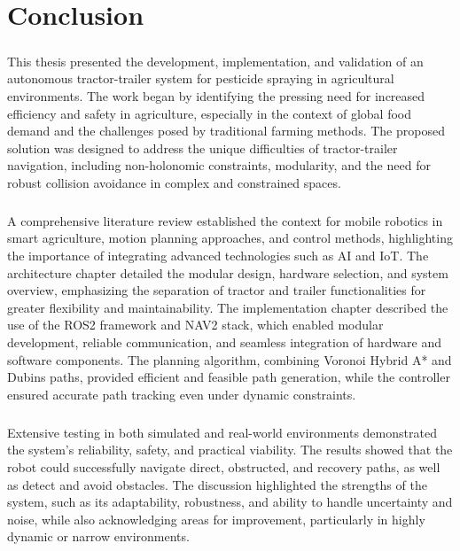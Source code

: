 
\chapter{Conclusion}
\label{cha:conclusion}


\paragraph{}This thesis presented the development, implementation, and validation of an autonomous tractor-trailer system for pesticide spraying in agricultural environments. The work began by identifying the pressing need for increased efficiency and safety in agriculture, especially in the context of global food demand and the challenges posed by traditional farming methods. The proposed solution was designed to address the unique difficulties of tractor-trailer navigation, including non-holonomic constraints, modularity, and the need for robust collision avoidance in complex and constrained spaces.

\paragraph{}A comprehensive literature review established the context for mobile robotics in smart agriculture, motion planning approaches, and control methods, highlighting the importance of integrating advanced technologies such as AI and IoT. The architecture chapter detailed the modular design, hardware selection, and system overview, emphasizing the separation of tractor and trailer functionalities for greater flexibility and maintainability. The implementation chapter described the use of the \gls{ROS2} framework and \gls{NAV2} stack, which enabled modular development, reliable communication, and seamless integration of hardware and software components. The planning algorithm, combining Voronoi Hybrid A* and Dubins paths, provided efficient and feasible path generation, while the controller ensured accurate path tracking even under dynamic constraints.

\paragraph{}Extensive testing in both simulated and real-world environments demonstrated the system's reliability, safety, and practical viability. The results showed that the robot could successfully navigate direct, obstructed, and recovery paths, as well as detect and avoid obstacles. The discussion highlighted the strengths of the system, such as its adaptability, robustness, and ability to handle uncertainty and noise, while also acknowledging areas for improvement, particularly in highly dynamic or narrow environments.

